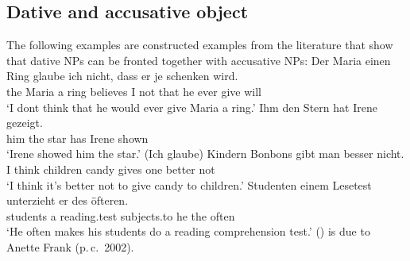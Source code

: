 \subsection{Dative and accusative object}
\label{sec-dat-acc-vf}

The following examples are constructed examples from the literature that show that dative NPs can be
fronted together with accusative NPs:
\eal
\ex 
\gll Der Maria einen Ring glaube ich nicht, dass er je schenken wird.\footnotemark\\
	 the Maria a ring believes I not that he ever give will\\
\glt `I dont think that he would ever give Maria a ring.'
\ex 
\gll Ihm den Stern hat Irene gezeigt.\footnotemark\\
	 him the star has Irene shown\\
\glt `Irene showed him the star.'
\ex 
\gll (Ich glaube) Kindern Bonbons gibt man besser nicht.\footnotemark\\
     I think children candy gives one better not\\
\glt `I think it's better not to give candy to children.'
\zl
\ea 
\gll Studenten einem Lesetest unterzieht er des öfteren.\\
     students a reading.test subjects.to he the often\\
\glt `He often makes his students do a reading comprehension test.'	
\z
() is due to Anette Frank (p.\,c.\ 2002).


